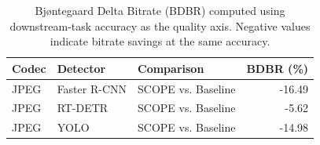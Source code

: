 \begin{table}[t]
\centering
\caption{Bjøntegaard Delta Bitrate (BDBR) computed using downstream-task accuracy as the quality axis. Negative values indicate bitrate savings at the same accuracy.}
\label{tab:ablation_bdbr}
\small
\setlength{\tabcolsep}{6pt}
\begin{tabular}{lllr}
\toprule
Codec & Detector & Comparison & BDBR (\%) \\
\midrule
JPEG & Faster R-CNN & SCOPE vs. Baseline & -16.49 \\
JPEG & RT-DETR & SCOPE vs. Baseline & -5.62 \\
JPEG & YOLO & SCOPE vs. Baseline & -14.98 \\
\bottomrule
\end{tabular}
\end{table}
